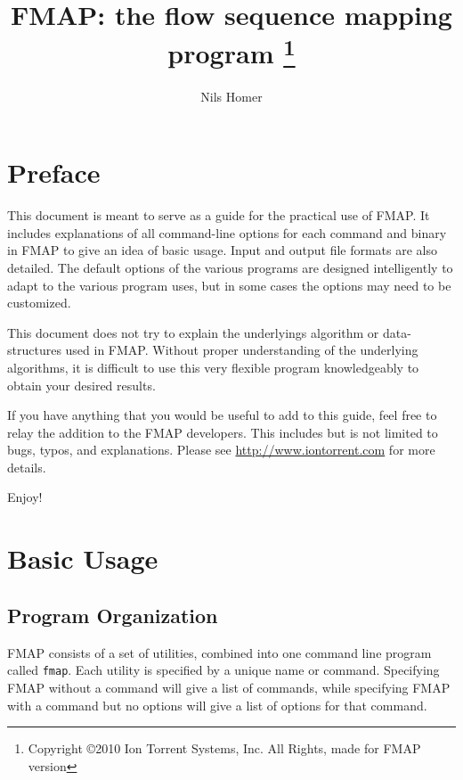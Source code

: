 \documentclass[a4paper,12pt]{book}
\author{Nils Homer}
\date{}
\title{FMAP: the flow sequence mapping program
\thanks{Copyright \copyright 2010 Ion Torrent Systems, Inc. All Rights, made for FMAP version \Version}
}
\newcommand{\TT}[1]{{\tt #1}} %
\begin{document}
\frontmatter

\maketitle

\tableofcontents
{}


\chapter{Preface}
This document is meant to serve as a guide for the practical use of FMAP.
It includes explanations of all command-line options for each command and binary in FMAP to give an idea of basic usage.
Input and output file formats are also detailed.
The default options of the various programs are designed intelligently to adapt to the various program uses, but in some cases the options may need to be customized.

This document does not try to explain the underlyings algorithm or data-structures used in FMAP.
Without proper understanding of the underlying algorithms, it is difficult to use this very flexible program knowledgeably to obtain your desired results.

If you have anything that you would be useful to add to this guide, feel free to relay the addition to the FMAP developers.
This includes but is not limited to bugs, typos, and explanations.
Please see \url{http://www.iontorrent.com} for more details.

Enjoy!

\mainmatter

\chapter{Basic Usage}

\section{Program Organization}
FMAP consists of a set of utilities, combined into one command line program called \TT{fmap}.  
Each utility is specified by a unique name or command.
Specifying FMAP without a command will give a list of commands, while specifying FMAP with a command but no options will give a list of options for that command.
\end{document}
